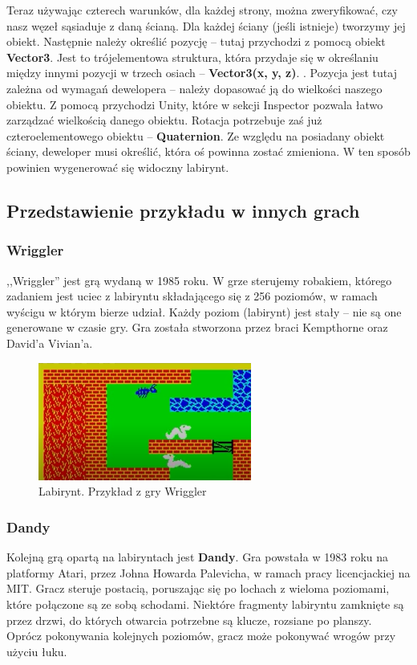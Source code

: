 \documentclass[oneside,polski,logo]{amuthesis}
\begin{document}
Teraz używając czterech warunków, dla każdej strony, można zweryfikować, czy nasz węzeł sąsiaduje z daną ścianą. Dla każdej ściany (jeśli istnieje) tworzymy jej obiekt. Następnie należy określić pozycję – tutaj przychodzi z pomocą obiekt \textbf{Vector3}. Jest to trójelementowa struktura, która przydaje się w określaniu między innymi pozycji w trzech osiach – \textbf{Vector3(x, y, z)}. \cite{Vector3}. Pozycja jest tutaj zależna od wymagań dewelopera – należy dopasować ją do wielkości naszego obiektu. Z pomocą przychodzi Unity, które w sekcji Inspector pozwala łatwo zarządzać wielkością danego obiektu. Rotacja potrzebuje zaś już czteroelementowego obiektu – \textbf{Quaternion}. Ze względu na posiadany obiekt ściany, deweloper musi określić, która oś powinna zostać zmieniona. W ten sposób powinien wygenerować się widoczny labirynt.



\subsection{Przedstawienie przykładu w innych grach}
\subsubsection{Wriggler}
\par ,,Wriggler'' jest grą wydaną w 1985 roku. W grze sterujemy robakiem, którego zadaniem jest uciec z labiryntu składającego się z 256 poziomów, w ramach wyścigu w którym bierze udział. Każdy poziom (labirynt) jest stały – nie są one generowane w czasie gry. Gra została stworzona przez braci Kempthorne oraz David'a Vivian'a. \cite{Wriggler}


\begin{figure}[h!]
	\centering
	\includegraphics[width=7cm]{images/tyrek/wriggler.png}
	\caption{Labirynt. Przykład z gry Wriggler}
\end{figure}

\subsubsection{Dandy}
\par Kolejną grą opartą na labiryntach jest \textbf{Dandy}. Gra powstała w 1983 roku na platformy Atari, przez Johna Howarda Palevicha, w ramach pracy licencjackiej na MIT. Gracz steruje postacią, poruszając się po lochach z wieloma poziomami, które połączone są ze sobą schodami. Niektóre fragmenty labiryntu zamknięte są przez drzwi, do których otwarcia potrzebne są klucze, rozsiane po planszy. Oprócz pokonywania kolejnych poziomów, gracz może pokonywać wrogów przy użyciu łuku. \cite{Dandy}
\clearpage
\end{document}
